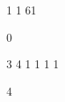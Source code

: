 \begin{myverbbox}[\small]{\vinput}
    1 1
    61
\end{myverbbox}

\begin{myverbbox}[\small]{\voutput}
    0
\end{myverbbox}


\begin{myverbbox}[\small]{\vinput}
    3 4
    1 1 1 1
\end{myverbbox}

\begin{myverbbox}[\small]{\voutput}
    4
\end{myverbbox}

